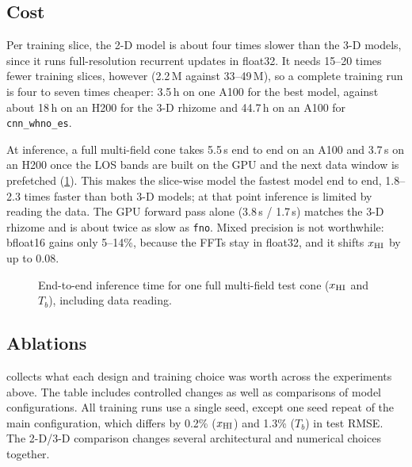 \subsection{Cost}
\label{sec:results-cost}

Per training slice, the 2-D model is about four times slower than the 3-D models, since it runs full-resolution recurrent updates in float32. It needs 15--20 times fewer training slices, however (2.2\,M against 33--49\,M), so a complete training run is four to seven times cheaper: 3.5\,h on one A100 for the best model, against about 18\,h on an H200 for the 3-D rhizome and 44.7\,h on an A100 for \texttt{cnn\_whno\_es}.

At inference, a full multi-field cone takes 5.5\,s end to end on an A100 and 3.7\,s on an H200 once the LOS bands are built on the GPU and the next data window is prefetched (\cref{fig:inference-cost}). This makes the slice-wise model the fastest model end to end, 1.8--2.3 times faster than both 3-D models; at that point inference is limited by reading the data. The GPU forward pass alone (3.8\,s / 1.7\,s) matches the 3-D rhizome and is about twice as slow as \texttt{fno}. Mixed precision is not worthwhile: bfloat16 gains only 5--14\%, because the FFTs stay in float32, and it shifts $x_{\mathrm{HI}}$ by up to 0.08.

\begin{figure}[!htbp]
  \centering
  \caption{End-to-end inference time for one full multi-field test cone ($x_{\mathrm{HI}}$ and $T_b$), including data reading.}
  \label{fig:inference-cost}
\end{figure}

\subsection{Ablations}
\label{sec:ablations}

 collects what each design and training choice was worth across the experiments above. The table includes controlled changes as well as comparisons of model configurations. All training runs use a single seed, except one seed repeat of the main configuration, which differs by 0.2\% ($x_{\mathrm{HI}}$) and 1.3\% ($T_b$) in test RMSE. The 2-D/3-D comparison changes several architectural and numerical choices together.

